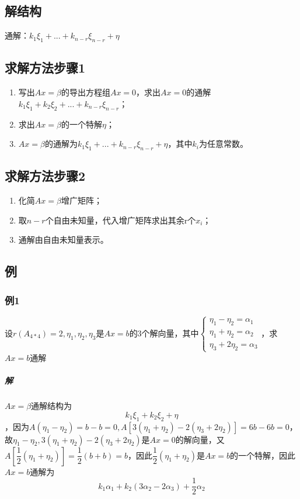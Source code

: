 \subsection{解结构}
通解：\(k_1\xi_1 + ... + k_{n - r}\xi_{n - r} + \eta\)


\subsection{求解方法步骤1}
\begin{enumerate}
    \item 写出\(Ax = \beta\)的导出方程组\(Ax = 0\)，求出\(Ax = 0\)的通解\(k_1\xi_1 + k_2\xi_2 + ... + k_{n - r}\xi_{n - r}\)；
    \item 求出\(Ax = \beta\)的一个特解\(\eta\)；
    \item \(Ax = \beta\)的通解为\(k_1\xi_1 + ... + k_{n - r}\xi_{n - r} + \eta\)，其中\(k_i\)为任意常数。
\end{enumerate}


\subsection{求解方法步骤2}
\begin{enumerate}
    \item 化简\(Ax = \beta\)增广矩阵；
    \item 取\(n - r\)个自由未知量，代入增广矩阵求出其余r个\(x_i\)；
    \item 通解由自由未知量表示。
\end{enumerate}


\subsection{例}

\subsubsection{例1}
设\(r(A_{4 * 4}) = 2, \eta_1, \eta_2, \eta_3\)是\(Ax = b\)的3个解向量，其中\(\begin{cases}
\eta_1 - \eta_2 = \alpha_1 \\ 
\eta_1 + \eta_2 = \alpha_2 \\ 
\eta_3 + 2\eta_2 = \alpha_3
\end{cases}\)，求\(Ax = b\)通解

\subparagraph{解}
\(Ax = \beta\)通解结构为\[k_1\xi_1 + k_2\xi_2 + \eta\]，因为\(A(\eta_1 - \eta_2) = b - b = 0, A[3(\eta_1 + \eta_2) - 2(\eta_3 + 2\eta_2)] = 6b - 6b = 0\)，故\(\eta_1 - \eta_2, 3(\eta_1 + \eta_2) - 2(\eta_3 + 2\eta_2)\)是\(Ax = 0\)的解向量，又\(A[\dfrac{1}{2}(\eta_1 + \eta_2)] = \dfrac{1}{2}(b + b) = b\)，因此\(\dfrac{1}{2}(\eta_1 + \eta_2)\)是\(Ax = b\)的一个特解，因此\(Ax = b\)通解为\[k_1\alpha_1 + k_2(3\alpha_2 - 2\alpha_3) + \dfrac{1}{2}\alpha_2\]

